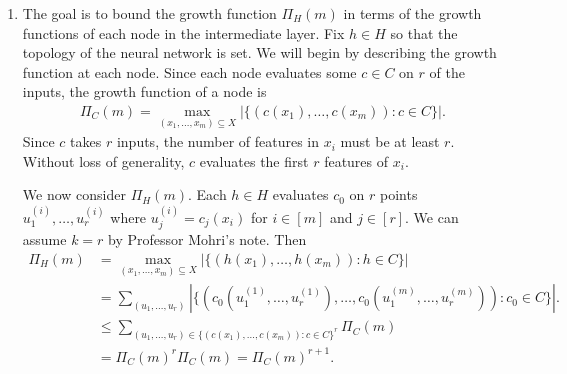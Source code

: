 \begin{enumerate}
    \item The goal is to bound the growth function
    $\Pi_H(m)$ in terms of the growth functions of each
    node in the intermediate layer.
    Fix $h \in H$ so that the topology of the neural
    network is set.
    We will begin by describing the growth function
    at each node.
    Since each node evaluates some $c \in C$ on $r$
    of the inputs, the growth function of a node is
    \begin{align}
        \Pi_C(m) = \max_{(x_1,\ldots, x_m)\subseteq X }
        |\{
            (c(x_1),\ldots, c(x_m)) : c\in C
        \}|.
        \nonumber
    \end{align}
    Since $c$ takes $r$ inputs, the number of features
    in $x_i$ must be at least $r$.
    Without loss of generality, $c$ evaluates
    the first $r$ features of $x_i$.

    We now consider $\Pi_H(m)$.
    Each $h \in H$ evaluates $c_0$ on $r$ points
    $u_1^{(i)},\ldots,u_r^{(i)}$ where $u_j^{(i)}=c_j(x_i)$
    for $i \in [m]$ and $j \in [r]$.
    We can assume $k=r$ by Professor Mohri's note.
    Then 
    \begin{align}
        \Pi_H(m) &= \max_{(x_1,\ldots, x_m)\subseteq X }
        |\{
            (h(x_1),\ldots, h(x_m)) : h\in C
        \}|
        \nonumber \\
        &= \sum_{(u_1,\ldots, u_r)}
        |\{
            (c_0(u_1^{(1)},\ldots,u_r^{(1)}),\ldots,
            c_0(u_1^{(m)},\ldots,u_r^{(m)})): c_0 \in C
        \}|.
        \nonumber \\
        &\leq \sum_{(u_1,\ldots, u_r) \in
        \{(c(x_1),\ldots,c(x_m)):c \in C\}^r} \Pi_C(m)
        \nonumber \\
        &= \Pi_C(m)^r \Pi_C(m) = \Pi_C(m)^{r+1}.
        \nonumber
    \end{align}


\end{enumerate}

